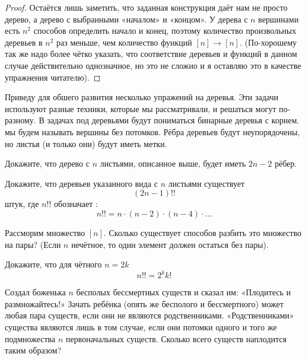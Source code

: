 \begin{proof}
Остаётся лишь заметить, что заданная конструкция даёт нам не просто дерево, а дерево с выбранными «началом» и «концом». У дерева с $n$ вершинами есть $n^2$ способов определить начало и конец, поэтому количество произвольных деревьев в $n^2$ раз меньше, чем количество функций $[n]\to[n]$. (По-хорошему так же надо более чётко указать, что соответствие деревьев и функций в данном случае действительно однозначное, но это не сложно и я оставляю это в качестве упражнения читателю).
\end{proof}

Приведу для обшего развития несколько упражений на деревья. Эти задачи используют разные техники, которые мы рассматривали, и решаться могут по-разному. В задачах под деревьями будут пониматься бинарные деревья с корнем.  мы будем называть вершины без потомков. Рёбра деревьев будут неупорядочены, но листья (и только они) будут иметь метки.

\begin{exercise}
Докажите, что дерево с $n$ листьями, описанное выше, будет иметь $2n-2$ рёбер.
\end{exercise}

\begin{exercise}
Докажите, что деревьев указанного вида с $n$ листьями существует
$$(2n - 1)!!$$
штук, где $n!!$ обозначает :
$$n!! = n\cdot (n-2) \cdot (n-4) \cdot\ldots$$
\end{exercise}

\begin{exercise}
Рассморим множество $[n]$. Сколько существует способов разбить это множество на пары? (Если $n$ нечётное, то один элемент должен остаться без пары).
\end{exercise}

\begin{exercise}
Докажите, что для чётного $n=2k$
$$n!! = 2^kk!$$
\end{exercise}

\begin{exercise}
Создал боженька $n$ бесполых бессмертных существ и сказал им: «Плодитесь и размножайтесь!» Зачать ребёнка (опять же бесполого и бессмертного) может любая пара существ, если они не являются родственниками. «Родственниками» существа являются лишь в том случае, если они потомки одного и того же подмножества $n$ первоначальных существ. Сколько всего существ наплодится таким образом? 
\end{exercise}
